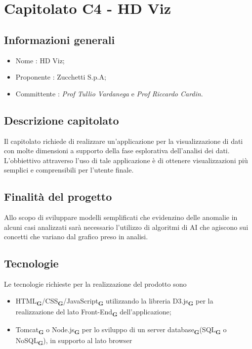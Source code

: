 \section{Capitolato C4 - HD Viz}

\subsection{Informazioni generali}

\begin{itemize}
\item Nome : HD Viz;
\item Proponente : Zucchetti S.p.A;
\item Committente : \emph{Prof Tullio Vardanega} e \emph{Prof Riccardo Cardin}.
\end{itemize}

\subsection{Descrizione capitolato}
Il capitolato richiede di realizzare un'applicazione per la
visualizzazione di dati con molte dimensioni a supporto della fase esplorativa
dell'analisi dei dati. L'obbiettivo attraverso l'uso di tale applicazione
è di ottenere visualizzazioni più semplici e comprensibili per l'utente finale. 

\subsection{Finalità del progetto}
Allo scopo di sviluppare modelli semplificati che evidenzino delle anomalie in alcuni casi analizzati sarà necessario l'utilizzo di algoritmi di AI che agiscono sui concetti che variano dal grafico preso in analisi.
 
\subsection{Tecnologie}
Le tecnologie richieste per la realizzazione del prodotto sono 
\begin{itemize}
\item HTML\textsubscript{\textbf{G}}/CSS\textsubscript{\textbf{G}}/JavaScript\textsubscript{\textbf{G}} utilizzando la libreria D3.js\textsubscript{\textbf{G}} per la realizzazione del lato Front-End\textsubscript{\textbf{G}} dell'applicazione;
\item Tomcat\textsubscript{\textbf{G}} o Node.js\textsubscript{\textbf{G}} per lo sviluppo di un server database\textsubscript{\textbf{G}}(SQL\textsubscript{\textbf{G}} o NoSQL\textsubscript{\textbf{G}}), in supporto al lato browser
\end{itemize}

